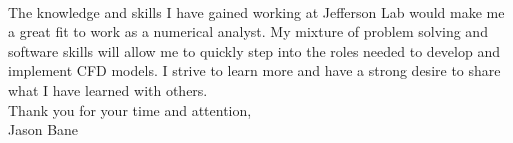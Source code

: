 \documentclass[12pt,letterpaper]{article}
\begin{document}
\paragraph{}The knowledge and skills I have gained working at Jefferson Lab would make me a great fit to work as a numerical analyst. My mixture of problem solving and software skills will allow me to quickly step into the roles needed to develop and implement CFD models. I strive to learn more and have a strong desire to share what I have learned with others. 
\\

\noindent Thank you for your time and attention,\\
\noindent Jason Bane
\end{document}
